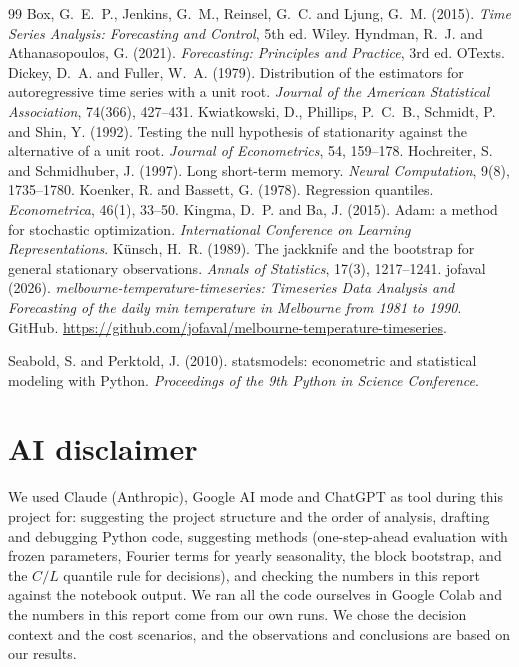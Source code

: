 \documentclass[11pt,a4paper]{article}
\begin{document}
\begin{thebibliography}{99}
 Box, G.~E.~P., Jenkins, G.~M., Reinsel, G.~C. and Ljung, G.~M. (2015). \emph{Time Series Analysis: Forecasting and Control}, 5th ed. Wiley.
 Hyndman, R.~J. and Athanasopoulos, G. (2021). \emph{Forecasting: Principles and Practice}, 3rd ed. OTexts.
 Dickey, D.~A. and Fuller, W.~A. (1979). Distribution of the estimators for autoregressive time series with a unit root. \emph{Journal of the American Statistical Association}, 74(366), 427--431.
 Kwiatkowski, D., Phillips, P.~C.~B., Schmidt, P. and Shin, Y. (1992). Testing the null hypothesis of stationarity against the alternative of a unit root. \emph{Journal of Econometrics}, 54, 159--178.
 Hochreiter, S. and Schmidhuber, J. (1997). Long short-term memory. \emph{Neural Computation}, 9(8), 1735--1780.
 Koenker, R. and Bassett, G. (1978). Regression quantiles. \emph{Econometrica}, 46(1), 33--50.
 Kingma, D.~P. and Ba, J. (2015). Adam: a method for stochastic optimization. \emph{International Conference on Learning Representations}.
 K\"unsch, H.~R. (1989). The jackknife and the bootstrap for general stationary observations. \emph{Annals of Statistics}, 17(3), 1217--1241.
 jofaval (2026). \emph{melbourne-temperature-timeseries: Timeseries Data Analysis and Forecasting of the daily min temperature in Melbourne from 1981 to 1990}. GitHub. \url{https://github.com/jofaval/melbourne-temperature-timeseries}.

 Seabold, S. and Perktold, J. (2010). statsmodels: econometric and statistical modeling with Python. \emph{Proceedings of the 9th Python in Science Conference}.
\end{thebibliography}

\newpage
\section*{AI disclaimer}
 We used Claude (Anthropic), Google AI mode and ChatGPT as tool during this project for: suggesting the project structure and the order of analysis, drafting and debugging Python code, suggesting methods (one-step-ahead evaluation with frozen parameters, Fourier terms for yearly seasonality, the block bootstrap, and the $C/L$ quantile rule for decisions), and checking the numbers in this report against the notebook output. We ran all the code ourselves in Google Colab and the numbers in this report come from our own runs. We chose the decision context and the cost scenarios, and the observations and conclusions are based on our results.
\end{document}
